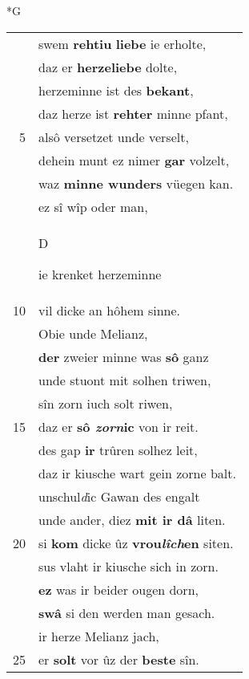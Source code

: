 \documentclass[8pt,a4paper,notitlepage]{article}
\begin{document}
\begin{table}[ht]
\begin{minipage}[t]{0.5\linewidth}
\end{minipage}
\end{table}
\newpage
\begin{table}[ht]
\begin{minipage}[t]{0.5\linewidth}
\small
\begin{center}*G
\end{center}
\begin{tabular}{rl}
 & swem \textbf{rehtiu} \textbf{liebe} ie erholte,\\ 
 & daz er \textbf{herzeliebe} dolte,\\ 
 & herzeminne ist des \textbf{bekant},\\ 
 & daz herze ist \textbf{rehter} minne pfant,\\ 
5 & alsô versetzet unde verselt,\\ 
 & dehein munt ez nimer \textbf{gar} volzelt,\\ 
 & waz \textbf{minne wunders} vüegen kan.\\ 
 & ez sî wîp oder man,\\ 
 & \begin{large}D\end{large}ie krenket herzeminne\\ 
10 & vil dicke an hôhem sinne.\\ 
 & Obie unde Melianz,\\ 
 & \textbf{der} zweier minne was \textbf{sô} ganz\\ 
 & unde stuont mit solhen triwen,\\ 
 & sîn zorn iuch solt riwen,\\ 
15 & daz er \textbf{sô \textit{zorn}ic} von ir reit.\\ 
 & des gap \textbf{ir} trûren solhez leit,\\ 
 & daz ir kiusche wart gein zorne balt.\\ 
 & unschul\textit{d}ic Gawan des engalt\\ 
 & unde ander, diez \textbf{mit ir dâ} liten.\\ 
20 & si \textbf{kom} dicke ûz \textbf{vrou\textit{lîch}en} siten.\\ 
 & sus vlaht ir kiusche sich in zorn.\\ 
 & \textbf{ez} was ir beider ougen dorn,\\ 
 & \textbf{swâ} si den werden man gesach.\\ 
 & ir herze Melianz jach,\\ 
25 & er \textbf{solt} vor ûz der \textbf{beste} sîn.\\ 

\end{tabular}
\end{minipage}
\end{table}
\end{document}
